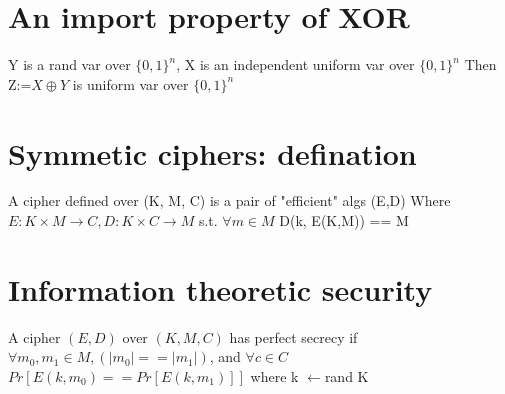 \documentclass{article}
\begin{document}
\section{An import property of XOR}
Y is a  rand var over $\{0,1\}^n$, X is an independent uniform var over $\{0,1\}^n$
Then Z:=$X \oplus Y$ is uniform var over  $\{0,1\}^n$ 

\section{Symmetic ciphers:  defination}
A cipher defined over (K, M, C) is a pair of "efficient" algs (E,D)
Where $E: K \times M\rightarrow C, D: K \times C \rightarrow M$
s.t. $\forall m \in M$ D(k, E(K,M)) == M

\section{Information theoretic security}
A cipher $\left(E,D\right)$ over $\left(K, M, C\right)$ has perfect secrecy if 
$\forall m_0, m_1 \in M, \left(|m_0|==|m_1|\right)$, and $\forall c \in C$
$Pr[E(k,m_0)==Pr[E(k,m_1)]]$ where k $\leftarrow$rand K
\end{document}
